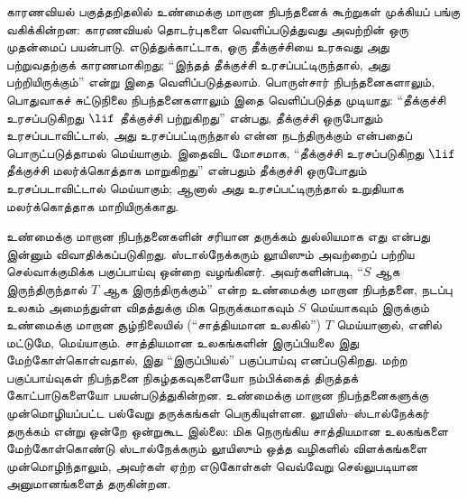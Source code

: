 \documentclass[../../../include/open-logic-section]{subfiles}
\begin{document}
காரணவியல் பகுத்தறிதலில் உண்மைக்கு மாறான நிபந்தனைக் கூற்றுகள் முக்கியப்
பங்கு வகிக்கின்றன: காரணவியல் தொடர்புகளை வெளிப்படுத்துவது அவற்றின் ஒரு
முதன்மைப் பயன்பாடு. எடுத்துக்காட்டாக, ஒரு தீக்குச்சியை உரசுவது அது
பற்றுவதற்குக் காரணமாகிறது; ``இந்தத் தீக்குச்சி உரசப்பட்டிருந்தால், அது
பற்றியிருக்கும்'' என்று இதை வெளிப்படுத்தலாம். பொருள்சார் நிபந்தனைகளாலும்,
பொதுவாகச் சுட்டுநிலை நிபந்தனைகளாலும் இதை வெளிப்படுத்த முடியாது:
``தீக்குச்சி உரசப்படுகிறது $\lif$ தீக்குச்சி பற்றுகிறது'' என்பது,
தீக்குச்சி ஒருபோதும் உரசப்படாவிட்டால், அது உரசப்பட்டிருந்தால் என்ன
நடந்திருக்கும் என்பதைப் பொருட்படுத்தாமல் மெய்யாகும். இதைவிட மோசமாக,
``தீக்குச்சி உரசப்படுகிறது $\lif$ தீக்குச்சி மலர்க்கொத்தாக மாறுகிறது''
என்பதும் தீக்குச்சி ஒருபோதும் உரசப்படாவிட்டால் மெய்யாகும்; ஆனால் அது
உரசப்பட்டிருந்தால் உறுதியாக மலர்க்கொத்தாக மாறியிருக்காது.

உண்மைக்கு மாறான நிபந்தனைகளின் சரியான தருக்கம் துல்லியமாக எது என்பது
இன்னும் விவாதிக்கப்படுகிறது. ஸ்டால்நேக்கரும் லூயிஸும் அவற்றைப் பற்றிய
செல்வாக்குமிக்க பகுப்பாய்வு ஒன்றை வழங்கினர். அவர்களின்படி, ``$S$ ஆக
இருந்திருந்தால் $T$ ஆக இருந்திருக்கும்'' என்ற உண்மைக்கு மாறான நிபந்தனை,
நடப்பு உலகம் அமைந்துள்ள விதத்துக்கு மிக நெருக்கமாகவும் $S$ மெய்யாகவும்
இருக்கும் உண்மைக்கு மாறான சூழ்நிலையில் (``சாத்தியமான உலகில்'') $T$
மெய்யானால், எனில் மட்டுமே, மெய்யாகும். சாத்தியமான உலகங்களின் இருப்பியலை
இது மேற்கோள்கொள்வதால், இது ``இருப்பியல்'' பகுப்பாய்வு எனப்படுகிறது.
மற்ற பகுப்பாய்வுகள் நிபந்தனை நிகழ்தகவுகளையோ நம்பிக்கைத் திருத்தக்
கோட்பாடுகளையோ பயன்படுத்துகின்றன. உண்மைக்கு மாறான நிபந்தனைகளுக்கு
முன்மொழியப்பட்ட பல்வேறு தருக்கங்கள் பெருகியுள்ளன. லூயிஸ்--ஸ்டால்நேக்கர்
தருக்கம் என்று ஒன்றே ஒன்றுகூட இல்லை: மிக நெருங்கிய சாத்தியமான உலகங்களை
மேற்கோள்கொண்டு ஸ்டால்நேக்கரும் லூயிஸும் ஒத்த வழிகளில் விளக்கங்களை
முன்மொழிந்தாலும், அவர்கள் ஏற்ற எடுகோள்கள் வெவ்வேறு செல்லுபடியான
அனுமானங்களைத் தருகின்றன.
\end{document}
